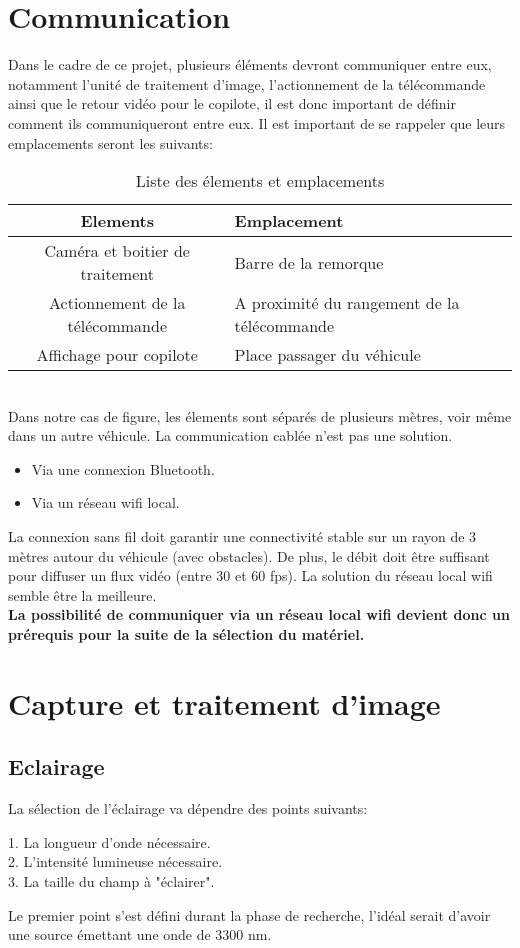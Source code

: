 \section{Communication}
Dans le cadre de ce projet, plusieurs éléments devront communiquer entre eux, notamment l'unité de traitement d'image,
l'actionnement de la télécommande ainsi que le retour vidéo pour le copilote, il est donc important de définir comment ils communiqueront entre eux.
Il est important de se rappeler que leurs emplacements seront les suivants:\\
\begin{table}[h]
    \begin{center}
        \caption{Liste des élements et emplacements}
        \begin{tabular}{|c|l|}
            Elements                        & Emplacement                                 \\ \hline
            Caméra et boitier de traitement & Barre de la remorque                        \\
            Actionnement de la télécommande & A proximité du rangement de la télécommande \\
            Affichage pour copilote         & Place passager du véhicule
        \end{tabular}
    \end{center}
\end{table}\\
Dans notre cas de figure, les élements sont séparés de plusieurs mètres, voir même dans un autre véhicule. La communication cablée n'est pas une solution.
\begin{itemize}
    \item Via une connexion Bluetooth.
    \item Via un réseau \Gls{wifi} local.
\end{itemize}
La connexion sans fil doit garantir une connectivité stable sur un rayon de 3 mètres autour du véhicule (avec obstacles). De plus, le débit doit être
suffisant pour diffuser un flux vidéo (entre 30 et 60 \Gls{fps}). La solution du réseau local \Gls{wifi} semble être la meilleure.\\
\textbf{La possibilité de communiquer via un réseau local \Gls{wifi} devient donc un prérequis pour la suite de la sélection du matériel.}
\section{Capture et traitement d'image}
\subsection{Eclairage}
La sélection de l'éclairage va dépendre des points suivants:
\begin{listage}
    1. La longueur d'onde nécessaire.\\
    2. L'intensité lumineuse nécessaire.\\
    3. La taille du champ à "éclairer".
\end{listage}
Le premier point s'est défini durant la phase de recherche, l'idéal serait d'avoir une source émettant une onde de 3300 \si{\nano\metre}.

